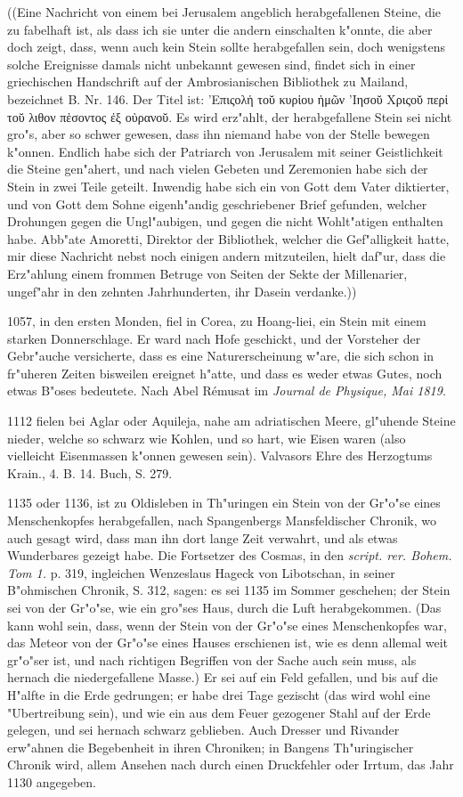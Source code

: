 \documentclass[a4paper, 11pt, oneside, polutonikogreek, german]{article}
\begin{document}
((Eine Nachricht von einem bei Jerusalem angeblich herabgefallenen Steine, die zu fabelhaft ist, als dass ich sie unter die andern einschalten k"onnte, die aber doch zeigt, dass, wenn auch kein Stein sollte herabgefallen sein, doch wenigstens solche Ereignisse damals nicht unbekannt gewesen sind, findet sich in einer griechischen Handschrift auf der Ambrosianischen Bibliothek zu Mailand, bezeichnet B. Nr. 146. Der Titel ist: 'Επιςολἡ τοῠ κυρἱου ἡμῶν 'Iησοῠ Χριςοῠ περἱ τοῠ λιθον πἑσοντος ἐξ οὐρανοῠ. Es wird erz"ahlt, der herabgefallene Stein sei nicht gro"s, aber so schwer gewesen, dass ihn niemand habe von der Stelle bewegen k"onnen. Endlich habe sich der Patriarch von Jerusalem mit seiner Geistlichkeit die Steine gen"ahert, und nach vielen Gebeten und Zeremonien habe sich der Stein in zwei Teile geteilt. Inwendig habe sich ein von Gott dem Vater diktierter, und von Gott dem Sohne eigenh"andig geschriebener Brief gefunden, welcher Drohungen gegen die Ungl"aubigen, und gegen die nicht Wohlt"atigen enthalten habe. Abb"ate Amoretti, Direktor der Bibliothek, welcher die Gef"alligkeit hatte, mir diese Nachricht nebst noch einigen andern mitzuteilen, hielt daf"ur, dass die Erz"ahlung einem frommen Betruge von Seiten der Sekte der Millenarier, ungef"ahr in den zehnten Jahrhunderten, ihr Dasein verdanke.))

1057, in den ersten Monden, fiel in Corea, zu Hoang-liei, ein Stein mit einem starken Donnerschlage. Er ward nach Hofe geschickt, und der Vorsteher der Gebr"auche versicherte, dass es eine Naturerscheinung w"are, die sich schon in fr"uheren Zeiten bisweilen ereignet h"atte, und dass es weder etwas Gutes, noch etwas B"oses bedeutete. Nach Abel Rémusat im \emph{Journal de Physique, Mai 1819}.

1112 fielen bei Aglar oder Aquileja, nahe am adriatischen Meere, gl"uhende Steine nieder, welche so schwarz wie Kohlen, und so hart, wie Eisen waren (also vielleicht Eisenmassen k"onnen gewesen sein). Valvasors Ehre des Herzogtums Krain., 4. B. 14. Buch, S. 279.

1135 oder 1136, ist zu Oldisleben in Th"uringen ein Stein von der Gr"o"se eines Menschenkopfes herabgefallen, nach Spangenbergs Mansfeldischer Chronik, wo auch gesagt wird, dass man ihn dort lange Zeit verwahrt, und als etwas Wunderbares gezeigt habe. Die Fortsetzer des Cosmas, in den \emph{script. rer. Bohem. Tom 1.} p. 319, ingleichen Wenzeslaus Hageck von Libotschan, in seiner B"ohmischen Chronik, S. 312, sagen: es sei 1135 im Sommer geschehen; der Stein sei von der Gr"o"se, wie ein gro"ses Haus, durch die Luft herabgekommen. (Das kann wohl sein, dass, wenn der Stein von der Gr"o"se eines Menschenkopfes war, das Meteor von der Gr"o"se eines Hauses erschienen ist, wie es denn allemal weit gr"o"ser ist, und nach richtigen Begriffen von der Sache auch sein muss, als hernach die niedergefallene Masse.) Er sei auf ein Feld gefallen, und bis auf die H"alfte in die Erde gedrungen; er habe drei Tage gezischt (das wird wohl eine "Ubertreibung sein), und wie ein aus dem Feuer gezogener Stahl auf der Erde gelegen, und sei hernach schwarz geblieben. Auch Dresser und Rivander erw"ahnen die Begebenheit in ihren Chroniken; in Bangens Th"uringischer Chronik wird, allem Ansehen nach durch einen Druckfehler oder Irrtum, das Jahr 1130 angegeben.
\end{document}
